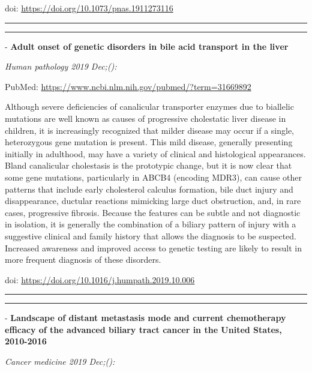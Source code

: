 \documentclass[
]{article}
\renewcommand{\linethickness}{0.05em}
\begin{document}
doi: \url{https://doi.org/10.1073/pnas.1911273116}

\begin{center}\rule{0.5\linewidth}{\linethickness}\end{center}

\begin{center}\rule{0.5\linewidth}{\linethickness}\end{center}

- \textbf{Adult onset of genetic disorders in bile acid transport in the
liver}

\emph{Human pathology 2019 Dec;():}

PubMed: \url{https://www.ncbi.nlm.nih.gov/pubmed/?term=31669892}

Although severe deficiencies of canalicular transporter enzymes due to
biallelic mutations are well known as causes of progressive cholestatic
liver disease in children, it is increasingly recognized that milder
disease may occur if a single, heterozygous gene mutation is present.
This mild disease, generally presenting initially in adulthood, may have
a variety of clinical and histological appearances. Bland canalicular
cholestasis is the prototypic change, but it is now clear that some gene
mutations, particularly in ABCB4 (encoding MDR3), can cause other
patterns that include early cholesterol calculus formation, bile duct
injury and disappearance, ductular reactions mimicking large duct
obstruction, and, in rare cases, progressive fibrosis. Because the
features can be subtle and not diagnostic in isolation, it is generally
the combination of a biliary pattern of injury with a suggestive
clinical and family history that allows the diagnosis to be suspected.
Increased awareness and improved access to genetic testing are likely to
result in more frequent diagnosis of these disorders.

doi: \url{https://doi.org/10.1016/j.humpath.2019.10.006}

\begin{center}\rule{0.5\linewidth}{\linethickness}\end{center}

\begin{center}\rule{0.5\linewidth}{\linethickness}\end{center}

- \textbf{Landscape of distant metastasis mode and current chemotherapy
efficacy of the advanced biliary tract cancer in the United States,
2010-2016}

\emph{Cancer medicine 2019 Dec;():}
\end{document}
